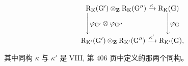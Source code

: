 \[
\begin{array}{c} \mathrm{R} _ {\mathrm{K}} (\mathrm{G} ^ {\prime}) \otimes_ {\mathbf {Z}} \mathrm{R} _ {\mathrm{K}} (\mathrm{G} ^ {\prime \prime}) \xrightarrow {\kappa} \mathrm{R} _ {\mathrm{K}} (\mathrm{G}) \\ \Biggl \downarrow \varphi_ {\mathrm{G} ^ {\prime}} \otimes \varphi_ {\mathrm{G} ^ {\prime \prime}} \qquad \qquad \qquad \Biggl \downarrow \varphi_ {\mathrm{G}} \\ \mathrm{R} _ {\mathrm{K} ^ {\prime}} (\mathrm{G} ^ {\prime}) \otimes_ {\mathbf {Z}} \mathrm{R} _ {\mathrm{K} ^ {\prime}} (\mathrm{G} ^ {\prime \prime}) \xrightarrow {\kappa^ {\prime}} \mathrm{R} _ {\mathrm{K} ^ {\prime}} (\mathrm{G})  , \end{array}
\]

其中同构 \(\kappa\) 与 \(\kappa'\) 是 VIII, 第 406 页中定义的那两个同构。

